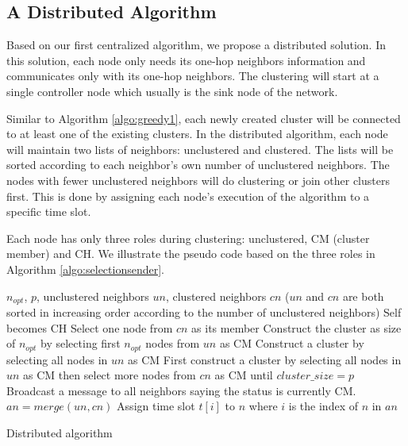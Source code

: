 \subsection{A Distributed Algorithm}
Based on our first centralized algorithm, we propose a distributed solution. In this solution, each node only needs its one-hop neighbors information and communicates only with its one-hop neighbors. The clustering will start at a single controller node which usually is the sink node of the network.

Similar to Algorithm \ref{algo:greedy1}, each newly created cluster will be connected to at least one of the existing clusters. In the distributed algorithm, each node will maintain two lists of neighbors: unclustered and clustered. The lists will be sorted according to each neighbor's own number of unclustered neighbors. The nodes with fewer unclustered neighbors will do clustering or join other clusters first. This is done by assigning each node's execution of the algorithm to a specific time slot.

Each node has only three roles during clustering: unclustered, CM (cluster member) and CH. We illustrate the pseudo code based on the three roles in Algorithm \ref{algo:selectionsender}.

\begin{algorithm}
\begin{algorithmic}[1]
\REQUIRE \(n_{opt}\), \(p\), unclustered neighbors \(un\), clustered neighbors \(cn\) (\(un\) and \(cn\) are both sorted in increasing order according to the number of unclustered neighbors)
	\STATE Self becomes CH
\ENDIF
{}
	\STATE Select one node from \(cn\) as its member
		\STATE Construct the cluster as size of \(n_{opt}\) by selecting first \(n_{opt}\) nodes from \(un\) as CM
		\STATE Construct a cluster by selecting all nodes in \(un\) as CM
	\ELSE
		\STATE First construct a cluster by selecting all nodes in \(un\) as CM then select more nodes from \(cn\) as CM until \(cluster\_ size=p\)
	\ENDIF
{}
	\STATE Broadcast a message to all neighbors saying the status is currently CM.
\ENDIF
\STATE \(an=merge(un, cn)\)
	\STATE Assign time slot \(t[i]\) to \(n\) where \(i\) is the index of \(n\) in \(an\)
\ENDFOR
\end{algorithmic}
\caption{Distributed algorithm}
\label{algo:selectionsender}
\end{algorithm}

